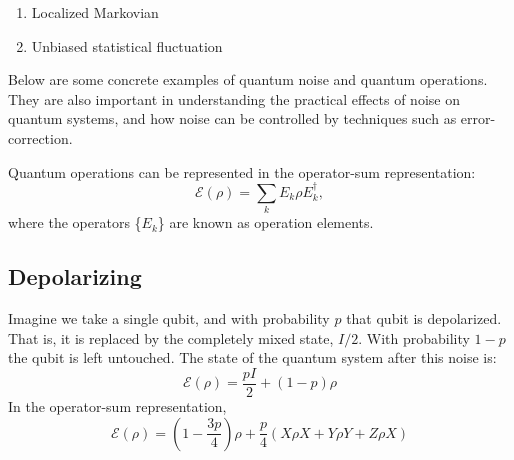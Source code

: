 \documentclass[11pt, oneside]{article}   	%
\begin{document}
\begin{enumerate}
\item Localized Markovian
\item Unbiased statistical fluctuation
\end{enumerate}

Below are some concrete examples of quantum noise and quantum operations. 
They are also important in understanding the practical effects of noise on quantum systems, and how noise can be controlled by techniques such as error-correction.

Quantum operations can be represented in the operator-sum representation:
\begin{equation}
\mathcal{E} (\rho) = \sum_k E_k \rho E^{\dagger}_k, 
\end{equation}
where the operators \{$E_k$\} are known as operation elements.

\subsection{Depolarizing}
Imagine we take a single qubit, and with probability $p$ that qubit is depolarized. 
That is, it is replaced by the completely mixed state, $I /2$. With probability $1-p$ the qubit is left untouched. 
The state of the quantum system after this noise is:
\begin{equation}
\mathcal{E} (\rho) = \frac{p I}{2} + (1-p) \rho
\end{equation}
In the operator-sum representation, 
\begin{equation}
\mathcal{E} (\rho) =\left({1 - \frac{3p}{4}} \right) \rho + \frac{p}{4} (X \rho X + Y \rho Y + Z \rho X)
\end{equation}
\end{document}
